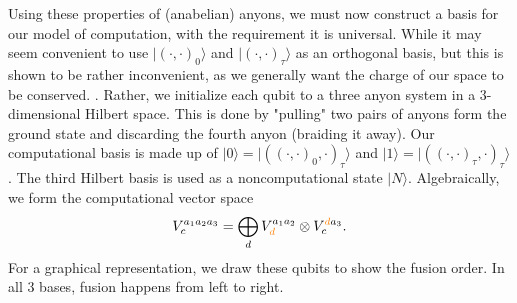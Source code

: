 \documentclass{article}
\begin{document}
Using these properties of (anabelian) anyons, we must now construct a basis for our model of computation, with the requirement it is universal. While it may seem convenient to use $\vert (\cdot, \cdot)_{0} \rangle$ and $\vert (\cdot, \cdot)_{\tau} \rangle$ as an orthogonal basis, but this is shown to be rather inconvenient, as we generally want the charge of our space to be conserved. \cite{freedman_topological_2002} \cite{hormozi_topological_2007}. Rather, we initialize each qubit to a three anyon system in a $3$-dimensional Hilbert space. This is done by "pulling" two pairs of anyons form the ground state and discarding the fourth anyon (braiding it away). Our computational basis is made up of $\vert 0 \rangle = \vert ((\cdot,\cdot)_0, \cdot)_{\tau} \rangle$ and $\vert 1 \rangle = \vert ((\cdot,\cdot)_{\tau}, \cdot)_{\tau} \rangle$. The third Hilbert basis is used as a noncomputational state $\vert N \rangle$. Algebraically, we form the computational vector space \cite{ahmadi_zx-calculus_2023}
\[
V^{a_1 a_2 a_3}_{c} = \bigoplus_{d} V^{a_1 a_2}_{{\color{orange}d}} \otimes V^{{\color{orange} d} a_3}_{c}.
\]
For a graphical representation, we draw these qubits to show the fusion order. In all 3 bases, fusion happens from left to right.
\end{document}
